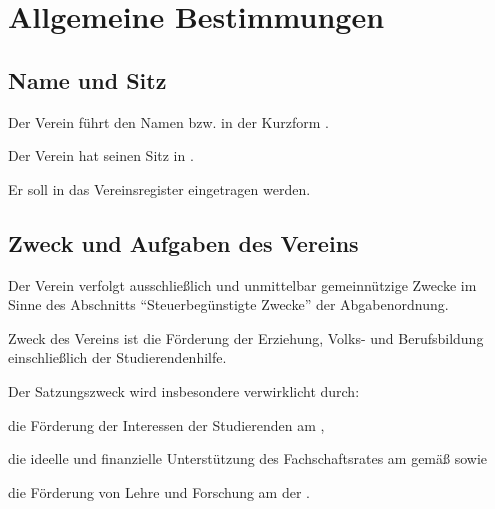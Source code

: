 \chapter{Allgemeine Bestimmungen}
\label{sec:Allg_Bestimmung}


\section{Name und Sitz}
	\begin{absätze}
		\item Der Verein führt den Namen \textit{\Vereinsname{}} bzw. in der Kurzform \textit{\VereinsnameKurz{}}.
		\item Der Verein hat seinen Sitz in \Stadt{}.
		\item Er soll in das Vereinsregister eingetragen werden.
	\end{absätze}

\section{Zweck und Aufgaben des Vereins}
	\begin{absätze}
		\item Der Verein verfolgt ausschließlich und unmittelbar gemeinnützige Zwecke im Sinne des Abschnitts "`Steuerbegünstigte Zwecke"' der Abgabenordnung.
		\item Zweck des Vereins ist die Förderung der Erziehung, Volks- und Berufsbildung einschließlich der Studierendenhilfe.
		\item Der Satzungszweck wird insbesondere verwirklicht durch:
		\begin{sätze}
			\item die Förderung der Interessen der Studierenden am \Fachbereich{},
			\item die ideelle und finanzielle Unterstützung des Fachschaftsrates am \Fachbereich{} gemäß \VerweisFachschaftsrat{} sowie
			\item die Förderung von Lehre und Forschung am \Fachbereich{} der \Uni{}.
		\end{sätze}
	\end{absätze}

